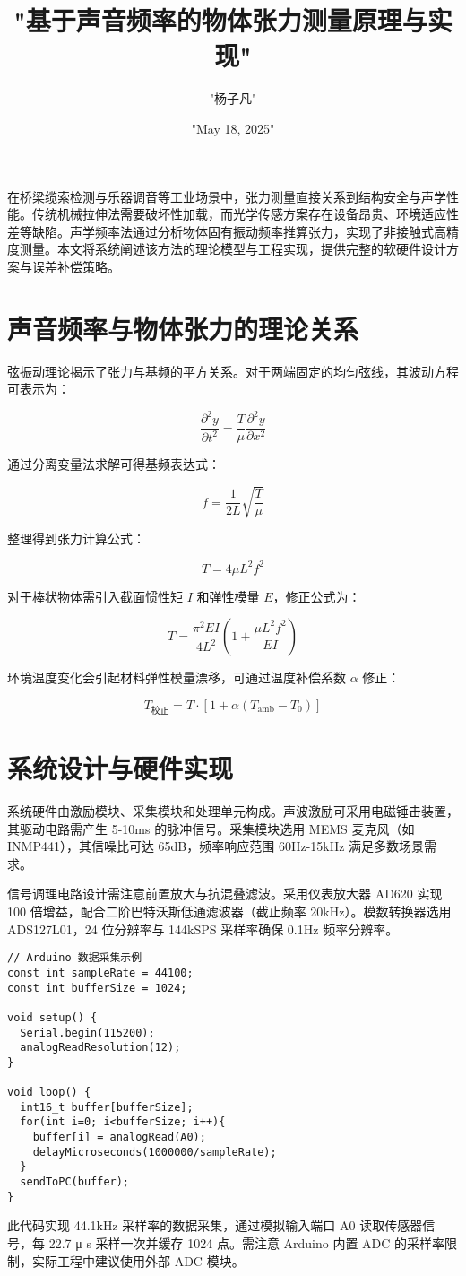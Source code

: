\title{"基于声音频率的物体张力测量原理与实现"}
\author{"杨子凡"}
\date{"May 18, 2025"}
\maketitle
在桥梁缆索检测与乐器调音等工业场景中，张力测量直接关系到结构安全与声学性能。传统机械拉伸法需要破坏性加载，而光学传感方案存在设备昂贵、环境适应性差等缺陷。声学频率法通过分析物体固有振动频率推算张力，实现了非接触式高精度测量。本文将系统阐述该方法的理论模型与工程实现，提供完整的软硬件设计方案与误差补偿策略。\par
\chapter{声音频率与物体张力的理论关系}
弦振动理论揭示了张力与基频的平方关系。对于两端固定的均匀弦线，其波动方程可表示为：\par
$$ \frac{\partial^2 y}{\partial t^2} = \frac{T}{\mu} \frac{\partial^2 y}{\partial x^2} $$\par
通过分离变量法求解可得基频表达式：\par
$$ f = \frac{1}{2L} \sqrt{\frac{T}{\mu}} $$\par
整理得到张力计算公式：\par
$$ T = 4\mu L^2f^2 $$\par
对于棒状物体需引入截面惯性矩 $I$ 和弹性模量 $E$，修正公式为：\par
$$ T = \frac{\pi^2 EI}{4L^2} \left(1 + \frac{\mu L^2 f^2}{EI}\right) $$\par
环境温度变化会引起材料弹性模量漂移，可通过温度补偿系数 $\alpha$ 修正：\par
$$ T_{\text{校正}} = T \cdot \left[1 + \alpha(T_{\text{amb}} - T_0)\right] $$\par
\chapter{系统设计与硬件实现}
系统硬件由激励模块、采集模块和处理单元构成。声波激励可采用电磁锤击装置，其驱动电路需产生 5-10ms 的脉冲信号。采集模块选用 MEMS 麦克风（如 INMP441），其信噪比可达 65dB，频率响应范围 60Hz-15kHz 满足多数场景需求。\par
信号调理电路设计需注意前置放大与抗混叠滤波。采用仪表放大器 AD620 实现 100 倍增益，配合二阶巴特沃斯低通滤波器（截止频率 20kHz）。模数转换器选用 ADS127L01，24 位分辨率与 144kSPS 采样率确保 0.1Hz 频率分辨率。\par
\begin{lstlisting}[language=arduino]
// Arduino 数据采集示例
const int sampleRate = 44100; 
const int bufferSize = 1024;

void setup() {
  Serial.begin(115200);
  analogReadResolution(12);
}

void loop() {
  int16_t buffer[bufferSize];
  for(int i=0; i<bufferSize; i++){
    buffer[i] = analogRead(A0);
    delayMicroseconds(1000000/sampleRate);
  }
  sendToPC(buffer);
}
\end{lstlisting}
此代码实现 44.1kHz 采样率的数据采集，通过模拟输入端口 A0 读取传感器信号，每 22.7 μ s 采样一次并缓存 1024 点。需注意 Arduino 内置 ADC 的采样率限制，实际工程中建议使用外部 ADC 模块。\par
